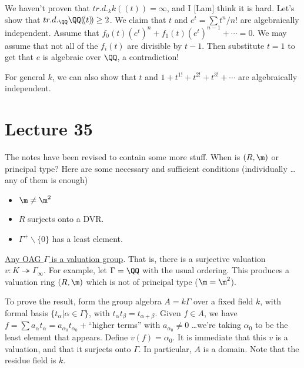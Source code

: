  We haven't proven that $tr.d._k k(\!(t)\!)=\infty$, and I [Lam] think it is hard. Let's
 show that $tr.d._\QQ \QQ(\!(t)\!)\ge 2$. We claim that $t$ and $e^t=\sum t^n/n!$ are
 algebraically independent. Assume that $f_0(t)(e^t)^n + f_1(t)(e^t)^{n-1}+\cdots =0$. We
 may assume that not all of the $f_i(t)$ are divisible by $t-1$. Then substitute $t=1$ to
 get that $e$ is algebraic over $\QQ$, a contradiction!

 For general $k$, we can also show that $t$ and $1+t^{1!}+t^{2!}+t^{3!}+\cdots$ are
 algebraically independent.
 \setcounter{lecture}{35}
 \section{Lecture 35}

 The notes have been revised to contain some more stuff. When is $(R,\m)$ or principal
 type? Here are some necessary and sufficient conditions (individually \dots any of them
 is enough)
 \begin{itemize}
   \item $\m\neq\m^2$
   \item $R$ surjects onto a DVR.
   \item $\Gamma^+\smallsetminus \{0\}$ has a least element.
 \end{itemize}

 \underline{Any OAG $\Gamma$ is a valuation group}. That is, there is a surjective
 valuation $v:K\twoheadrightarrow \Gamma_\infty$. For example, let $\Gamma=\QQ$ with the
 usual ordering. This produces a valuation ring $(R,\m)$ which is not of principal type
 ($\m=\m^2$).

 To prove the result, form the group algebra $A=k\Gamma$ over a fixed field $k$, with
 formal basis $\{t_\alpha|\alpha\in \Gamma\}$, with $t_\alpha t_\beta=t_{\alpha+\beta}$.
 Given $f\in A$, we have $f=\sum a_\alpha t_\alpha = a_{\alpha_0}t_{\alpha_0} + $``higher
 terms'' with $a_{\alpha_0}\neq0$ \dots we're taking $\alpha_0$ to be the least element
 that appears. Define $v(f)=\alpha_0$. It is immediate that this $v$ is a valuation, and
 that it surjects onto $\Gamma$. In particular, $A$ is a domain. Note that the residue
 field is $k$.

